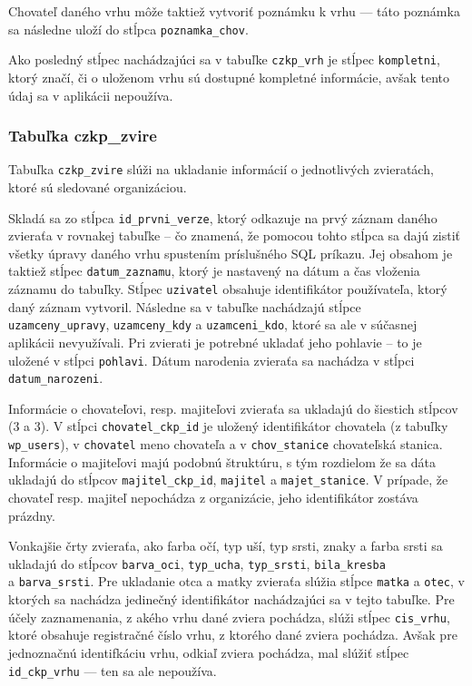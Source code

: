 Chovateľ daného vrhu môže taktiež vytvoriť poznámku k vrhu --- táto poznámka sa následne uloží do stĺpca \texttt{poznamka_chov}.

Ako posledný stĺpec nachádzajúci sa v tabuľke \texttt{czkp_vrh} je stĺpec \texttt{kompletni}, ktorý značí, či o uloženom vrhu sú dostupné kompletné informácie, avšak tento údaj sa v aplikácii nepoužíva.

\subsubsection*{Tabuľka czkp\_zvire}

Tabuľka \texttt{czkp_zvire} slúži na ukladanie informácií o jednotlivých zvieratách, ktoré sú sledované organizáciou.

Skladá sa zo stĺpca \texttt{id_prvni_verze}, ktorý odkazuje na prvý záznam daného zvieraťa v rovnakej tabuľke -- čo znamená, že pomocou tohto stĺpca sa dajú zistiť všetky úpravy daného vrhu spustením príslušného SQL príkazu.
Jej obsahom je taktiež stĺpec \texttt{datum_zaznamu}, ktorý je nastavený na dátum a čas vloženia záznamu do tabuľky. Stĺpec \texttt{uzivatel} obsahuje identifikátor používateľa, ktorý daný záznam vytvoril. Následne sa v tabuľke nachádzajú stĺpce \texttt{uzamceny_upravy}, \texttt{uzamceny_kdy} a \texttt{uzamceni_kdo}, ktoré sa ale v súčasnej aplikácii nevyužívali. Pri zvierati je potrebné ukladať jeho pohlavie -- to je uložené v stĺpci \texttt{pohlavi}. Dátum narodenia zvieraťa sa nachádza v stĺpci \texttt{datum_narozeni}.

Informácie o chovateľovi, resp. majiteľovi zvieraťa sa ukladajú do šiestich stĺpcov (3 a 3). V stĺpci \texttt{chovatel_ckp_id} je uložený identifikátor chovatela (z tabuľky \texttt{wp_users}), v \texttt{chovatel} meno chovateľa a v \texttt{chov_stanice} chovateľská stanica. Informácie o majiteľovi majú podobnú štruktúru, s tým rozdielom že sa dáta ukladajú do stĺpcov \texttt{majitel_ckp_id}, \texttt{majitel} a \texttt{majet_stanice}. V prípade, že chovateľ resp. majiteľ nepochádza z organizácie, jeho identifikátor zostáva prázdny.

Vonkajšie črty zvieraťa, ako farba očí, typ uší, typ srsti, znaky a farba srsti sa ukladajú do stĺpcov \texttt{barva_oci}, \texttt{typ_ucha}, \texttt{typ_srsti}, \texttt{bila_kresba} \\ a \texttt{barva_srsti}.
Pre ukladanie otca a matky zvieraťa slúžia stĺpce \texttt{matka} a \texttt{otec}, v ktorých sa nachádza jedinečný identifikátor nachádzajúci sa v tejto tabuľke. Pre účely zaznamenania, z akého vrhu dané zviera pochádza, slúži stĺpec \texttt{cis_vrhu}, ktoré obsahuje registračné číslo vrhu, z ktorého dané zviera pochádza. Avšak pre jednoznačnú identifkáciu vrhu, odkiaľ zviera pochádza, mal slúžiť stĺpec \texttt{id_ckp_vrhu} --- ten sa ale nepoužíva.

